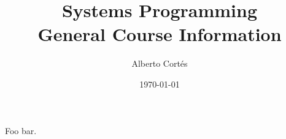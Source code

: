 \documentclass[11pt, a4paper, twoside]{article}
\begin{document}
\title{Systems Programming\\General Course Information}
\author{Alberto Cortés}
\date{\today}
\maketitle

Foo bar.
\end{document}

